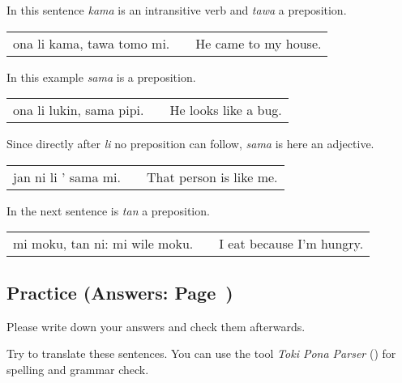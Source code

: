 %
%
In this sentence \textit{kama} is an intransitive verb and \textit{tawa} a preposition.

\begin{supertabular}{p{5,5cm}|ll}
ona li kama, tawa tomo mi. && He came to my house. \\
\end{supertabular} 

%

In this example \textit{sama} is a preposition.

\begin{supertabular}{p{5,5cm}|ll}
ona li lukin, sama pipi. && He looks like a bug. \\
\end{supertabular} 

Since directly after \textit{li} no preposition can follow, \textit{sama} is here an adjective. 

\begin{supertabular}{p{5,5cm}|ll}
jan ni li ' sama mi. && That person is like me. \\
\end{supertabular} 

%

In the next sentence is \textit{tan} a preposition. 

\begin{supertabular}{p{5,5cm}|ll}
mi moku, tan ni: mi wile moku. &&  I eat because I'm hungry. \\
\end{supertabular} 

%
\newpage
\subsection*{Practice (Answers: Page~\pageref{'prepositional_objects'})}
%
Please write down your answers and check them afterwards. 

Try to translate these sentences. 
You can use the tool \textit{Toki Pona Parser} (\cite{www:rowa:02}) for spelling and grammar check. 

